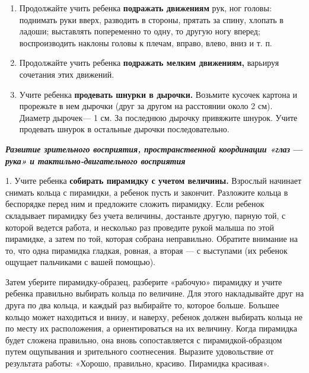 \documentclass[a5paper]{book}
\renewcommand{\emph}[1]{\textit{#1}}
\begin{document}
\begin{enumerate}
\def\labelenumi{\arabic{enumi}.}
\setcounter{enumi}{4}
\item
  
  Продолжайте учить ребенка \textbf{подражать движениям} рук, ног
  головы: поднимать руки вверх, разводить в стороны, прятать за спину,
  хлопать в ладоши; выставлять попеременно то одну, то другую ногу
  вперед; воспроизводить наклоны головы к плечам, вправо, влево, вниз и
  т. п.
  
\item
  
  Продолжайте учить ребенка \textbf{подражать мелким движениям,}
  варьируя сочетания этих движений.
  
\item
  
  Учите ребенка \textbf{продевать шнурки в дырочки.} Возьмите кусочек
  картона и прорежьте в нем дырочки (друг за другом на расстоянии около
  2 см). Диаметр дырочек--- 1 см. За последнюю дырочку привяжите шнурок.
  Учите продевать шнурок в остальные дырочки последовательно.
  
\end{enumerate}


\textbf{\emph{Развитие зрительного восприятия, пространственной
координации «глаз} --- \emph{рука»} \emph{и тактильно-двигательного
восприятия}}

1. Учите ребенка \textbf{собирать пирамидку с учетом величины.} Взрослый
начинает снимать кольца с пирамидки, а ребенок пусть и закончит.
Разложите кольца в беспорядке перед ним и предложите сложить пирамидку.
Если ребенок складывает пирамидку без учета величины, достаньте другую,
парную той, с которой ведется работа, и несколько раз проведите рукой
малыша по этой пирамидке, а затем по той, которая собрана неправильно.
Обратите внимание на то, что одна пирамидка гладкая, ровная, а вторая
--- с выступами (их ребенок ощущает пальчиками с вашей помощью).

Затем уберите пирамидку-образец, разберите «рабочую» пирамидку и учите
ребенка правильно выбирать кольца по величине. Для этого накладывайте
друг на друга по два кольца, и каждый раз выбирайте то, которое больше.
Большее кольцо может находиться и внизу, и наверху, ребенок должен
выбирать кольца не по месту их расположения, а ориентироваться на их
величину. Когда пирамидка будет сложена правильно, она вновь
сопоставляется с пирамидкой-образцом путем ощупывания и зрительного
соотнесения. Выразите удовольствие от результата работы: «Хорошо,
правильно, красиво. Пирамидка красивая».
\end{document}
